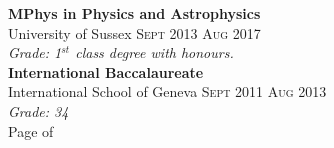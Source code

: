 \documentclass[oneside]{article}
\begin{document}
{\begin{minipage}[t][\dimexpr\textheight-2\fboxrule-2\fboxsep\relax][t]{\dimexpr0.6\textwidth-2\fboxrule-2\fboxsep\relax}
        {\large \textbf{MPhys in Physics and Astrophysics}} \\ {University of Sussex} \hfill
        {\scshape{}\selectfont\footnotesize Sept 2013 \textendash{} Aug 2017} \\
        {\textit{Grade: 1$^{st}$ class degree with honours.}} \\

        {\large \textbf{International Baccalaureate}} \\ {International School of Geneva}\hfill
        {\scshape{}\selectfont\footnotesize Sept 2011 \textendash{} Aug 2013} \\
        {\textit{Grade: 34}} \\
        \vfill%
        {\hfill\small{}\selectfont Page \thepage of \pageref{LastPage}\hfill}
    \end{minipage}
}
\hfill%
\end{document}
